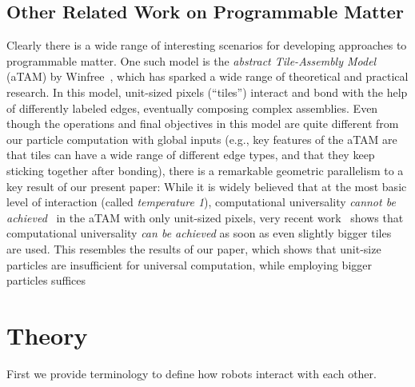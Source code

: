 \documentclass[letterpaper, 10 pt, conference]{ieeeconf}
\begin{document}
\subsection{Other Related Work on Programmable Matter}
Clearly there is a wide range of interesting scenarios for developing approaches to programmable matter.
One such model is the \emph{abstract Tile-Assembly Model} (aTAM) by Winfree~\cite{Winf98,WLWS98,LaWiRe99}, which has 
sparked a wide range of theoretical and practical research. In this model, unit-sized pixels (``tiles'')
interact and bond with the help of differently labeled edges, eventually composing complex assemblies.
Even though the operations and final objectives in this model are quite different from our particle computation with global
inputs (e.g., key features of the aTAM are that tiles can have a wide range of different edge types, and
that they keep sticking together after bonding), there is
a remarkable geometric parallelism to a key result of our present paper:
While it is widely believed that at the most basic level of interaction (called {\em temperature 1}),
computational universality {\em cannot be achieved}~\cite{LSAT1,ManuchTemp1,IUNeedsCoop} in the aTAM with only unit-sized pixels, 
very recent work~\cite{fhp+-ucapt-15} shows that computational universality {\em can be achieved} as soon as even slightly bigger tiles are used. 
This resembles the results of our paper, which shows that unit-size particles are insufficient for universal computation, while employing bigger particles suffices

\section{Theory}\label{sec:theory}

First we provide terminology to define how robots interact with each other. 

\end{document}
